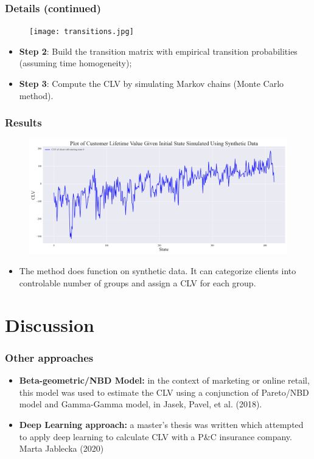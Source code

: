 \documentclass[aspectratio=169,xcolor=x11names,compress]{beamer}
\begin{document}
\begin{frame}
\frametitle{Details (continued)}

\begin{figure}
	\texttt{[image: transitions.jpg]}
\end{figure}
	
\begin{itemize}
	\item \textbf{Step 2}: Build the transition matrix with empirical transition probabilities (assuming time homogeneity);
	\item \textbf{Step 3}: Compute the CLV by simulating Markov chains (Monte Carlo method).
\end{itemize}
\end{frame}

\begin{frame}
  \frametitle{Results}
  
  \begin{figure}
    \includegraphics[scale = 0.25]{result_plot.png}
  \end{figure}
    
  \begin{itemize}
    \item The method does function on synthetic data. It can categorize clients into controlable number of groups and assign a CLV for each group.
  \end{itemize}
  \end{frame}

\section{Discussion}

\begin{frame}
\frametitle{Other approaches}

\begin{itemize}
\item \textbf{Beta-geometric/NBD Model:} in the context of marketing or online retail, this model was used to estimate the CLV using a conjunction of Pareto/NBD model and Gamma-Gamma model, in Jasek, Pavel, et al. (2018).
\item \textbf{Deep Learning approach:} a master's thesis was written which attempted to apply deep learning to calculate CLV with a P$\&$C insurance company. Marta Jablecka (2020)
\end{itemize}

\end{frame}
\end{document}
